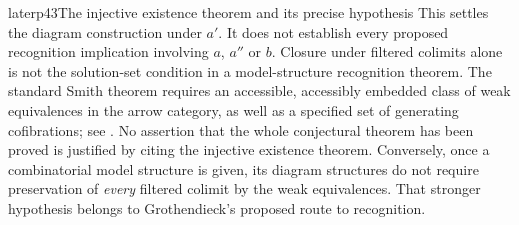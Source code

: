 \begin{dcomment}{later}{p43}{The injective existence theorem and its precise hypothesis}
This settles the diagram construction under $a'$. It does not establish every proposed recognition implication involving $a$, $a''$ or $b$. Closure under filtered colimits alone is not the solution-set condition in a model-structure recognition theorem. The standard Smith theorem requires an accessible, accessibly embedded class of weak equivalences in the arrow category, as well as a specified set of generating cofibrations; see \citet[Proposition~1.7]{Barwick2007}. No assertion that the whole conjectural theorem has been proved is justified by citing the injective existence theorem. Conversely, once a combinatorial model structure is given, its diagram structures do not require preservation of \emph{every} filtered colimit by the weak equivalences. That stronger hypothesis belongs to Grothendieck's proposed route to recognition.
\end{dcomment}

